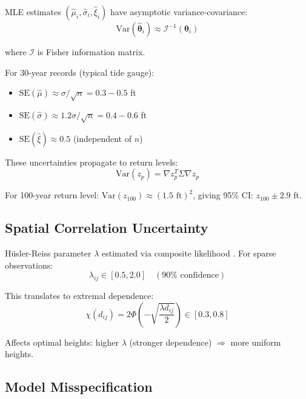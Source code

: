\documentclass[review]{elsarticle}
\begin{document}
MLE estimates $(\hat{\mu}_i, \hat{\sigma}_i, \hat{\xi}_i)$ have asymptotic variance-covariance:
\begin{equation}
\text{Var}(\hat{\boldsymbol{\theta}}_i) \approx \mathcal{I}^{-1}(\boldsymbol{\theta}_i)
\label{eq:fisher_info}
\end{equation}

where $\mathcal{I}$ is Fisher information matrix.

For 30-year records (typical tide gauge):
\begin{itemize}
\item $\text{SE}(\hat{\mu}) \approx \sigma/\sqrt{n} = 0.3-0.5$ ft
\item $\text{SE}(\hat{\sigma}) \approx 1.2\sigma/\sqrt{n} = 0.4-0.6$ ft
\item $\text{SE}(\hat{\xi}) \approx 0.5$ (independent of $n$)
\end{itemize}

These uncertainties propagate to return levels:
\begin{equation}
\text{Var}(z_p) = \nabla z_p^T \Sigma \nabla z_p
\label{eq:delta_method}
\end{equation}

For 100-year return level: $\text{Var}(z_{100}) \approx (1.5\text{ ft})^2$, giving 95\% CI: $z_{100} \pm 2.9$ ft.

\subsection{Spatial Correlation Uncertainty}

Hüsler-Reiss parameter $\lambda$ estimated via composite likelihood \cite{padoan2010multivariate}. For sparse observations:
\begin{equation}
\lambda_{ij} \in [0.5, 2.0] \quad (90\% \text{ confidence})
\end{equation}

This translates to extremal dependence:
\begin{equation}
\chi(d_{ij}) = 2\Phi\left(-\sqrt{\frac{\lambda d_{ij}}{2}}\right) \in [0.3, 0.8]
\end{equation}

Affects optimal heights: higher $\lambda$ (stronger dependence) $\Rightarrow$ more uniform heights.

\subsection{Model Misspecification}
\end{document}
